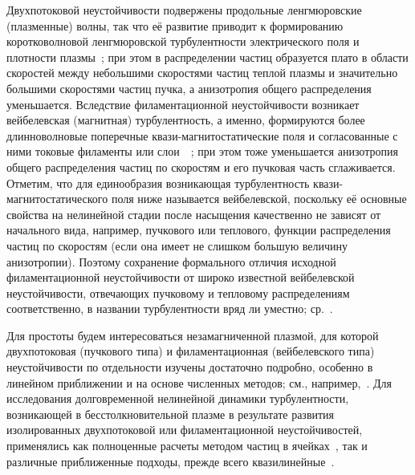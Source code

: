 Двухпотоковой неустойчивости подвержены продольные ленгмюровские (плазменные) волны, так что её развитие приводит к формированию коротковолновой ленгмюровской турбулентности электрического поля и плотности плазмы~\cite{Vedenov1963,Zakharov1972,VedenovRyutov1975,Krall1973,GaleevSagdeev1984,Ivanov1975,Appert1976,Yi2010,Bakunin2017,Sun2022}; при этом в распределении частиц образуется плато в области скоростей между небольшими скоростями частиц теплой плазмы и значительно большими скоростями частиц пучка, а анизотропия общего распределения уменьшается. Вследствие филаментационной неустойчивости возникает вейбелевская (магнитная) турбулентность, а именно, формируются более длинноволновые поперечные квази-магнитостатические поля и согласованные с ними токовые филаменты или слои~~\cite{Weibel1959, Fried1959, Kalman1968, Morse1971, Lazar2006,SchaeferRolffs2006, Stockem2009, Kocharovsky2016,Ruyer2020,Zhou2022,Zhang2022}; при этом тоже уменьшается анизотропия общего распределения частиц по скоростям и его пучковая часть сглаживается. Отметим, что для единообразия возникающая турбулентность квази-магнитостатического поля ниже называется вейбелевской, поскольку её основные свойства на нелинейной стадии после насыщения качественно не зависят от начального вида, например, пучкового или теплового, функции распределения частиц по скоростям (если она имеет не слишком большую величину анизотропии). Поэтому сохранение формального отличия исходной филаментационной неустойчивости от широко известной вейбелевской неустойчивости, отвечающих пучковому и тепловому распределениям соответственно, в названии турбулентности вряд ли уместно; ср.~\cite{Bret2004,Bret2010}.

Для простоты будем интересоваться незамагниченной плазмой, для которой двухпотоковая (пучкового типа) и филаментационная (вейбелевского типа) неустойчивости по отдельности изучены достаточно подробно, особенно в линейном приближении и на основе численных методов; см., например,~\cite{Mikhailovsky1971,Krall1973,Fried1959,Tzoufras2006,Hao2008,Bret2010,Moya2022}. Для исследования долговременной нелинейной динамики турбулентности, возникающей в бесстолкновительной плазме в результате развития изолированных двухпотоковой или филаментационной неустойчивостей, применялись как полноценные расчеты методом частиц в ячейках~\cite{Morse1971,Dum1994,Kasaba2001,Gaelzer2003,Dieckmann2009,Bret2010,Yi2010,Ruyer2015,Garasev2022,Lazar2023,Nechaev2023,Kuznetsov2023,Korzhimanov2025,Kocharovsky2024}, так и различные приближенные подходы, прежде всего квазилинейные~\cite{Vedenov1963,Davidson1972,VedenovRyutov1975,Appert1976,Lemons1979,Ziebell2008,Ruyer2015,Bakunin2017,Kuznetsov2022,Kuznetsov2023,Schekochihin2026}. 

